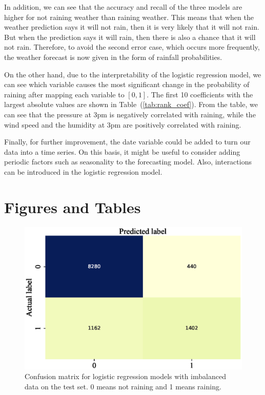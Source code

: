\documentclass[11pt, a4paper, jou]{apa7}
\begin{document}
In addition, we can see that the accuracy and recall of the three models are higher for not raining weather than raining weather. This means that when the weather prediction says it will not rain, then it is very likely that it will not rain. But when the prediction says it will rain, then there is also a chance that it will not rain. Therefore, to avoid the second error case, which occurs more frequently, the weather forecast is now given in the form of rainfall probabilities. 

On the other hand, due to the interpretability of the logistic regression model, we can see which variable causes the most significant change in the probability of raining after mapping each variable to $[0,1]$. The first 10 coefficients with the largest absolute values are shown in Table~(\ref{tab:rank_coef}). From the table, we can see that the pressure at 3pm is negatively correlated with raining, while the wind speed and the humidity at 3pm are positively correlated with raining. 

Finally, for further improvement, the date variable could be added to turn our data into a time series. On this basis, it might be useful to consider adding periodic factors such as seasonality to the forecasting model. Also, interactions can be introduced in the logistic regression model. 

\printbibliography 
\clearpage
\appendix
\section{Figures and Tables}

\begin{figure}[p]
    \centering
    \caption{Confusion matrix for logistic regression models with imbalanced data on the test set. 0 means not raining and 1 means raining. }\label{fig:log_cm}
    \includegraphics[width=.45\textwidth]{figures/log_cm.eps}
\end{figure}
\end{document}
